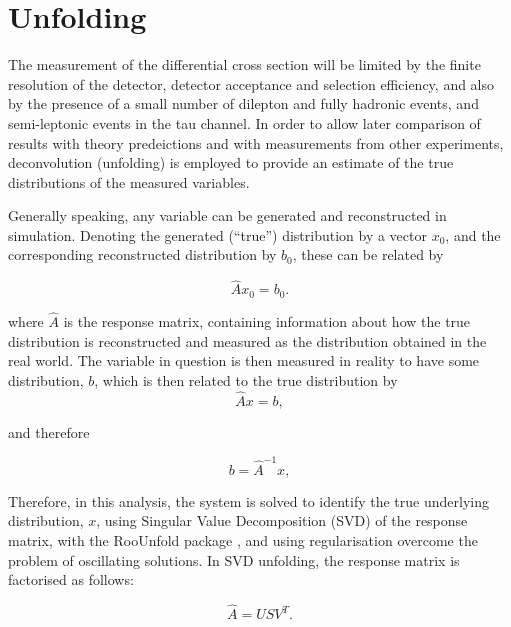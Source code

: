 \section{Unfolding}
\label{ss:unfolding}

The measurement of the differential cross section will be limited by the finite resolution of the detector,
detector acceptance and selection efficiency, and also by the presence of a small number of
dilepton and fully hadronic \ttbar events, and semi-leptonic events in the tau channel. In order to allow
later comparison of results with theory predeictions and with measurements from other experiments,
deconvolution (unfolding) is employed to provide an estimate of the true distributions of the measured
variables.

Generally speaking, any variable can be generated and reconstructed in simulation. Denoting the generated
(``true'') distribution by a vector $x_{0}$, and the corresponding reconstructed distribution by $b_{0}$,
these can be related by

\begin{equation}
\label{eq:unfolding_MC}
\hat{A} x_0 = b_0.
\end{equation}

where $\hat{A}$ is the response matrix, containing information about how the true distribution is
reconstructed and measured as the distribution obtained in the real world. The variable in question is then
measured in reality to have some distribution, $b$, which is then related to the true distribution by
\begin{equation}
\label{eq:unfolding_data}
\hat{A} x = b,
\end{equation}

and therefore

\begin{equation}
\label{eq:unfolding_data_rearranged}
b = \hat{A}^{-1} x,
\end{equation}

Therefore, in this analysis, the system is solved to identify the true underlying distribution, $x$, using
Singular Value Decomposition (SVD) \cite{Hocker:1995kb} of the response matrix, with the RooUnfold package
\cite{Adye:2011gm}, and using regularisation overcome the problem of oscillating solutions. In SVD unfolding,
the response matrix is factorised as follows:

\begin{equation}
\hat{A} = USV^{T}.
\label{eq:response}
\end{equation}

